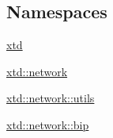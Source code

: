 \subsection*{Namespaces}
\begin{DoxyCompactItemize}
\item 
\hyperlink{namespacextd}{xtd}
\item 
\hyperlink{namespacextd_1_1network}{xtd\-::network}
\item 
\hyperlink{namespacextd_1_1network_1_1utils}{xtd\-::network\-::utils}
\item 
\hyperlink{namespacextd_1_1network_1_1bip}{xtd\-::network\-::bip}
\end{DoxyCompactItemize}
